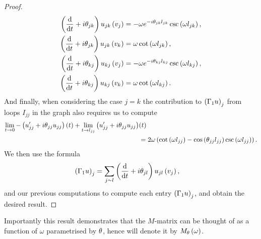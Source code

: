 \begin{proof}
	\begin{align*}
		\left( \dfrac{\mathrm{d}}{\mathrm{d}t}+i\theta_{jk} \right)u_{jk}\left( v_j \right) &= -\omega e^{-i\theta_{jk}l_{jk}}\csc\left( \omega l_{jk} \right), \\
		\left( \dfrac{\mathrm{d}}{\mathrm{d}t}+i\theta_{jk} \right)u_{jk}\left( v_k \right) &= \omega\cot\left( \omega l_{jk} \right), \\
		\left( \dfrac{\mathrm{d}}{\mathrm{d}t}+i\theta_{kj} \right)u_{kj}\left( v_j \right) &= -\omega e^{-i\theta_{kj}l_{kj}}\csc\left( \omega l_{kj} \right), \\
		\left( \dfrac{\mathrm{d}}{\mathrm{d}t}+i\theta_{kj} \right)u_{kj}\left( v_k \right) &= \omega\cot\left( \omega l_{kj} \right).
	\end{align*}
	And finally, when considering the case $j=k$ the contribution to $\left( \Gamma_1 u \right)_j$ from loops $I_{jj}$ in the graph also requires us to compute
	\begin{align*}
		\lim_{t\rightarrow0}-\left( u_{jj}'+i\theta_{jj}u_{jj} \right)(t) + \lim_{t\rightarrow l_{jj}}\left( u_{jj}'+i\theta_{jj}u_{jj} \right) & (t) \\
		&= 2\omega\left(  \cot\left( \omega l_{jj} \right) - \cos\left( \theta_{jj}l_{jj} \right)\csc\left( \omega l_{jj} \right) \right).	
	\end{align*}
	We then use the formula
	\begin{align*}
		\left( \Gamma_1 u \right)_j &= \sum_{j\sim l} \left( \dfrac{\mathrm{d}}{\mathrm{d}t}+i\theta_{jl} \right)u_{jl}\left( v_j \right),
	\end{align*}
	and our previous computations to compute each entry $\left( \Gamma_1 u \right)_j$, and obtain the desired result.
\end{proof}
Importantly this result demonstrates that the $M$-matrix can be thought of as a function of $\omega$ parametrised by $\theta$, hence will denote it by $M_{\theta}\left( \omega \right)$.
